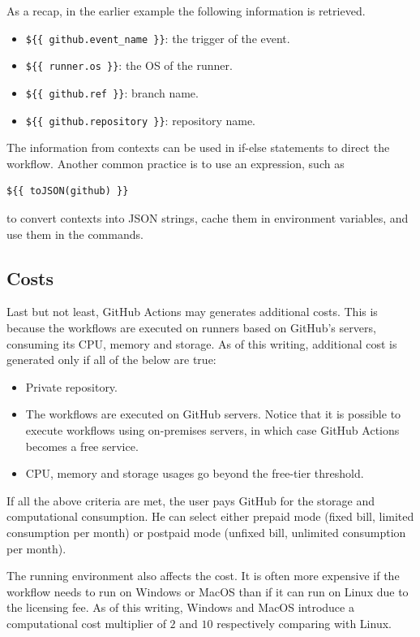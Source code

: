 As a recap, in the earlier example the following information is retrieved.
\begin{itemize}
  \item \verb|${{ github.event_name }}|: the trigger of the event.
  \item \verb|${{ runner.os }}|: the OS of the runner.
  \item \verb|${{ github.ref }}|: branch name.
  \item \verb|${{ github.repository }}|: repository name.
\end{itemize}

The information from contexts can be used in if-else statements to direct the workflow. Another common practice is to use an expression, such as
\begin{lstlisting}
${{ toJSON(github) }}
\end{lstlisting}
to convert contexts into JSON strings, cache them in environment variables, and use them in the commands.



\subsection{Costs}

Last but not least, GitHub Actions may generates additional costs. This is because the workflows are executed on runners based on GitHub's servers, consuming its CPU, memory and storage. As of this writing, additional cost is generated only if all of the below are true:
\begin{itemize}
	\item Private repository.
	\item The workflows are executed on GitHub servers. Notice that it is possible to execute workflows using on-premises servers, in which case GitHub Actions becomes a free service.
	\item CPU, memory and storage usages go beyond the free-tier threshold.
\end{itemize}

If all the above criteria are met, the user pays GitHub for the storage and computational consumption. He can select either prepaid mode (fixed bill, limited consumption per month) or postpaid mode (unfixed bill, unlimited consumption per month).

The running environment also affects the cost. It is often more expensive if the workflow needs to run on Windows or MacOS than if it can run on Linux due to the licensing fee. As of this writing, Windows and MacOS introduce a computational cost multiplier of $2$ and $10$ respectively comparing with Linux.
